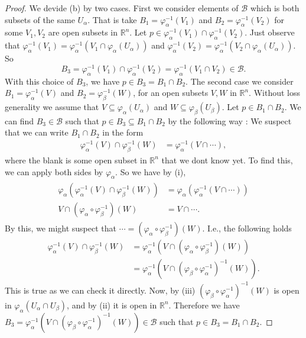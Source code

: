 \documentclass[a4paper]{article}
\theoremstyle{remark}
\newcommand{\rn}{\mathbb{R}^n} %
\newcommand{\subhim}{\subseteq} %
\newcommand{\Ualpha}{U_{\alpha}} %
\newcommand{\Ubeta}{U_{\beta}} %
\newcommand{\VarphiAlpha}{\varphi_{\alpha}} %
\newcommand{\VarphiBeta}{\varphi_{\beta}} %
\begin{document}
\begin{proof}
We devide (b) by two cases. First we consider elements of $\mathcal{B}$ which is both subsets of the same $\Ualpha$. That is take $B_1 = \VarphiAlpha^{-1}(V_1)$ and $B_2 = \VarphiAlpha^{-1}(V_2)$ for some $V_1,V_2$ are open subsets in $\rn$. Let $p \in \VarphiAlpha^{-1}(V_1) \cap \VarphiAlpha^{-1}(V_2)$. Just observe that $\VarphiAlpha^{-1}(V_1) = \VarphiAlpha^{-1}(V_1 \cap \VarphiAlpha(\Ualpha))$ and $\VarphiAlpha^{-1}(V_2) = \VarphiAlpha^{-1}(V_2 \cap \VarphiAlpha(\Ualpha))$. So
$$
B_3 = \VarphiAlpha^{-1}(V_1) \cap \VarphiAlpha^{-1}(V_2) = \VarphiAlpha^{-1}(V_1 \cap V_2) \in \mathcal{B}.
$$
With this choice of $B_3$, we have $p \in B_3= B_1\cap B_2$. The second case we consider $B_1 = \VarphiAlpha^{-1}(V)$ and $B_2=\VarphiBeta^{-1}(W)$, for an open subsets $V,W$ in $\rn$. Without loss generality we assume that $V \subhim \VarphiAlpha(\Ualpha)$ and $W \subhim \VarphiBeta(\Ubeta)$. Let $p \in B_1 \cap B_2$. We can find $B_3 \in \mathcal{B}$ such that $p \in B_3 \subhim B_1\cap B_2$ by the following way : We suspect that we can write $B_1\cap B_2$ in the form
\begin{align*}
\VarphiAlpha^{-1}(V) \cap \VarphiBeta^{-1}(W) &= \VarphiAlpha^{-1}(V \cap \cdots),
\end{align*}
where the blank is some open subset in $\rn$ that we dont know yet. To find this, we can apply both sides by $\VarphiAlpha$. So we have by (i),
\begin{align*}
\begin{split}
\VarphiAlpha (\VarphiAlpha^{-1}(V) \cap \VarphiBeta^{-1}(W)) &= \VarphiAlpha (\VarphiAlpha^{-1}(V \cap \cdots)) \\
V \cap (\VarphiAlpha \circ \VarphiBeta^{-1})(W) &= V \cap \cdots.
\end{split}
\end{align*} 
By this, we might suspect that $\cdots = (\VarphiAlpha \circ \VarphiBeta^{-1})(W)$. I.e., the following holds
\begin{align*}
\VarphiAlpha^{-1}(V) \cap \VarphiBeta^{-1}(W) &= \VarphiAlpha^{-1}(V \cap (\VarphiAlpha \circ \VarphiBeta^{-1})(W))\\ &= \VarphiAlpha^{-1}(V \cap (\VarphiBeta \circ \VarphiAlpha^{-1})^{-1}(W)).
\end{align*}
This is true as we can check it directly. Now, by (iii) $(\VarphiBeta \circ \VarphiAlpha^{-1})^{-1}(W)$ is open in $\VarphiAlpha(\Ualpha\cap \Ubeta)$, and by (ii) it is open in $\rn$. Therefore we have $B_3 = \VarphiAlpha^{-1}(V \cap (\VarphiBeta \circ \VarphiAlpha^{-1})^{-1}(W)) \in \mathcal{B}$ such that $p \in B_3 = B_1 \cap B_2$. 


\end{proof}
\end{document}
